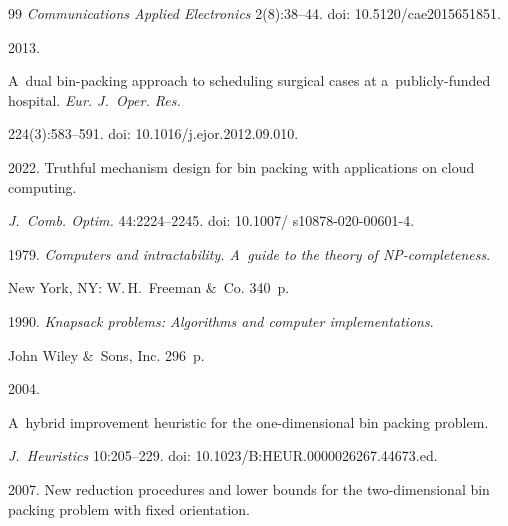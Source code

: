 {{\begin{thebibliography}{99}
\textit{Communications Applied Electronics} 2(8):38--44. doi: 10.5120\!/\!cae2015651851.




 2013. 

A~dual bin-packing approach to scheduling surgical cases at a~publicly-funded hospital. \textit{Eur. J.~Oper. Res.} 

224(3):583--591. doi: 10.1016\!/\!j.ejor.2012.09.010.




 2022. Truthful mechanism design for bin packing with applications on cloud computing. 

\textit{J.~Comb. Optim.} 44:2224--2245. doi: 10.1007\!/ s10878-020-00601-4.




 1979. \textit{Computers and intractability. A~guide to the theory of NP-completeness}. 

New York, NY: W.\,H.~Freeman \&~Co. 340~p.




 1990. \textit{Knapsack problems: Algorithms and computer implementations}. 


John Wiley \&~Sons, Inc. 296~p.








 2004. 

A~hybrid improvement heuristic for the one-dimensional bin packing problem. 

\textit{J.~Heuristics} 10:205--229. doi: 10.1023\!/\!B:HEUR.0000026267.44673.ed.





 2007. New reduction procedures and lower bounds for the two-dimensional bin packing problem with fixed orientation. 


\end{thebibliography}}}
